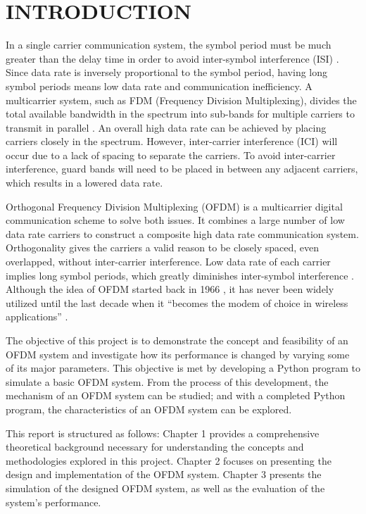 \section*{INTRODUCTION}

In a single carrier communication system, the symbol period must be much greater than the delay time in order to avoid inter-symbol interference (ISI) \cite{b1}. Since data rate is inversely proportional to the symbol period, having long symbol periods means low data rate and communication inefficiency. A multicarrier system, such as FDM (Frequency Division Multiplexing), divides the total available bandwidth in the spectrum into sub-bands for multiple carriers to transmit in parallel \cite{b2}. An overall high data rate can be achieved by placing carriers closely in the spectrum. However, inter-carrier interference (ICI) will occur due to a lack of spacing to separate the carriers. To avoid inter-carrier interference, guard bands will need to be placed in between any adjacent carriers, which results in a lowered data rate.

Orthogonal Frequency Division Multiplexing (OFDM) is a multicarrier digital communication scheme to solve both issues. It combines a large number of low data rate carriers to construct a composite high data rate communication system. Orthogonality gives the carriers a valid reason to be closely spaced, even overlapped, without inter-carrier interference. Low data rate of each carrier implies long symbol periods, which greatly diminishes inter-symbol interference \cite{b3}. Although the idea of OFDM started back in 1966 \cite{b4}, it has never been widely utilized until the last decade when it “becomes the modem of choice in wireless applications” \cite{b5}.

The objective of this project is to demonstrate the concept and feasibility of an OFDM system and investigate how its performance is changed by varying some of its major parameters. This objective is met by developing a Python program to simulate a basic OFDM system. From the process of this development, the mechanism of an OFDM system can be studied; and with a completed Python program, the characteristics of an OFDM system can be explored.

This report is structured as follows: Chapter 1 provides a comprehensive theoretical background necessary for understanding the concepts and methodologies explored in this project. Chapter 2 focuses on presenting the design and implementation of the OFDM system. Chapter 3 presents the simulation of the designed OFDM system, as well as the evaluation of the system's performance.